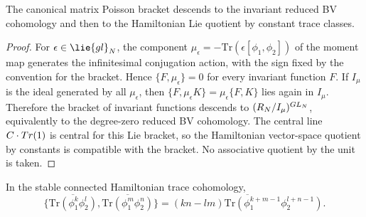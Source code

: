 \documentclass[11pt]{memoir}
\begin{document}
\begin{lem}\label{lem:trace-bracket-descends}
  The canonical matrix Poisson bracket descends to the invariant reduced BV
  cohomology and then to the Hamiltonian Lie quotient by constant trace
  classes.
\end{lem}

\begin{proof}
  For $\epsilon\in\lie{gl}_N$, the component
  $\mu_\epsilon=-\mathrm{Tr}(\epsilon[\phi_1,\phi_2])$ of the moment map
  generates the infinitesimal conjugation action, with the sign fixed by the
  convention for the bracket. Hence $\{F,\mu_\epsilon\}=0$ for every invariant
  function $F$. If $I_\mu$ is the ideal generated by all $\mu_\epsilon$, then
  $\{F,\mu_\epsilon K\}=\mu_\epsilon\{F,K\}$ lies again in $I_\mu$. Therefore
  the bracket of invariant functions descends to
  $(R_N/I_\mu)^{GL_N}$, equivalently to the degree-zero reduced BV
  cohomology. The central line $C\cdot Tr(1)$ is central for this Lie
  bracket, so the Hamiltonian vector-space quotient by constants is compatible
  with the bracket. No associative quotient by the unit is taken.
\end{proof}

\begin{prop}\label{prop:first-order-bracket}
  In the stable connected Hamiltonian trace cohomology,
  $$\{\overline{\mathrm{Tr}(\phi_1^k\phi_2^l)},
      \overline{\mathrm{Tr}(\phi_1^m\phi_2^n)}\}
    =\overline{(kn-lm)\mathrm{Tr}
      (\phi_1^{k+m-1}\phi_2^{l+n-1})}.$$
\end{prop}
\end{document}
